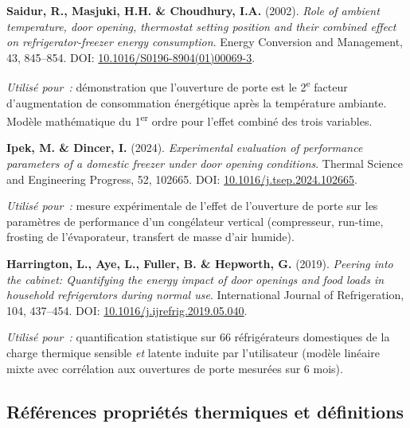 \documentclass[11pt,a4paper]{article}
\begin{document}
\begin{enumerate}[label={[\arabic*]},itemsep=4pt,start=5]

\item \label{saidur2002}
\textbf{Saidur, R., Masjuki, H.H. \& Choudhury, I.A.} (2002). \emph{Role of ambient
temperature, door opening, thermostat setting position and their combined effect on
refrigerator-freezer energy consumption}. Energy Conversion and Management, 43,
845--854. DOI: \href{https://doi.org/10.1016/S0196-8904(01)00069-3}
{10.1016/S0196-8904(01)00069-3}.

\textit{Utilisé pour~:} démonstration que l'ouverture de porte est le 2\textsuperscript{e}
facteur d'augmentation de consommation énergétique après la température ambiante.
Modèle mathématique du 1\textsuperscript{er} ordre pour l'effet combiné des trois variables.

\medskip
\item \label{ipek2024}
\textbf{Ipek, M. \& Dincer, I.} (2024). \emph{Experimental evaluation of performance
parameters of a domestic freezer under door opening conditions}. Thermal Science and
Engineering Progress, 52, 102665. DOI: \href{https://doi.org/10.1016/j.tsep.2024.102665}
{10.1016/j.tsep.2024.102665}.

\textit{Utilisé pour~:} mesure expérimentale de l'effet de l'ouverture de porte sur les
paramètres de performance d'un congélateur vertical (compresseur, run-time, frosting de
l'évaporateur, transfert de masse d'air humide).

\medskip
\item \label{harrington2019}
\textbf{Harrington, L., Aye, L., Fuller, B. \& Hepworth, G.} (2019). \emph{Peering into
the cabinet: Quantifying the energy impact of door openings and food loads in household
refrigerators during normal use}. International Journal of Refrigeration, 104, 437--454.
DOI: \href{https://doi.org/10.1016/j.ijrefrig.2019.05.040}{10.1016/j.ijrefrig.2019.05.040}.

\textit{Utilisé pour~:} quantification statistique sur 66 réfrigérateurs domestiques de la
charge thermique sensible \emph{et} latente induite par l'utilisateur (modèle linéaire
mixte avec corrélation aux ouvertures de porte mesurées sur 6 mois).

\end{enumerate}

\subsection*{Références propriétés thermiques et définitions}
\end{document}
